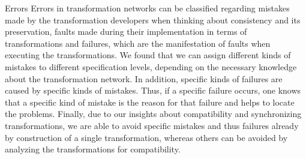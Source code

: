 \begin{insight}{Errors}
    Errors in transformation networks can be classified regarding mistakes made by the transformation developers when thinking about consistency and its preservation, faults made during their implementation in terms of transformations and failures, which are the manifestation of faults when executing the transformations.
    We found that we can assign different kinds of mistakes to different specification levels, depending on the necessary knowledge about the transformation network.
    In addition, specific kinds of failures are caused by specific kinds of mistakes.
    Thus, if a specific failure occurs, one knows that a specific kind of mistake is the reason for that failure and helps to locate the problems.
    Finally, due to our insights about compatibility and synchronizing transformations, we are able to avoid specific mistakes and thus failures already by construction of a single transformation, whereas others can be avoided by analyzing the transformations for compatibility.
\end{insight}